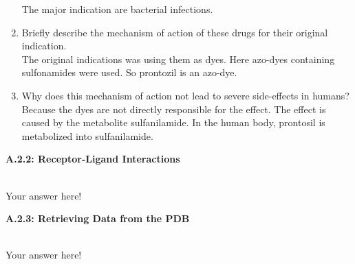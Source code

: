 \documentclass[a4paper,10pt]{article}
\begin{document}
\begin{enumerate}
    The major indication are bacterial infections. 
    \item Briefly describe the mechanism of action of these drugs for their original indication. \\
    The original indications was using them as dyes. Here azo-dyes containing sulfonamides were used. So prontozil is an azo-dye.
    \item Why does this mechanism of action not lead to severe side-effects in humans? \\
    Because the dyes are not directly responsible for the effect. The effect is caused by the metabolite sulfanilamide. In the human body, prontosil is metabolized into sulfanilamide. 
\end{enumerate}


\begin{large}
	\vspace{1.0cm}
	\textbf{A.2.2: Receptor-Ligand Interactions}
\end{large}	\\ [2mm]


Your answer here!


\begin{large}
	\vspace{1.0cm}
	\textbf{A.2.3: Retrieving Data from the PDB}
\end{large}	\\ [2mm]


Your answer here!



\end{document}
